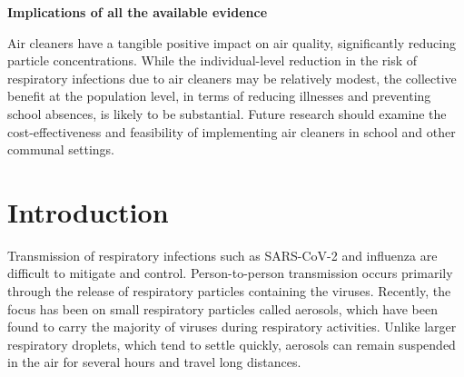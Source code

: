 \documentclass[fleqn,11pt]{wlscirep}
\begin{document}
\noindent \textbf{Implications of all the available evidence} \smallskip

\noindent Air cleaners have a tangible positive impact on air quality, significantly reducing particle concentrations. While the individual-level reduction in the risk of respiratory infections due to air cleaners may be relatively modest, the collective benefit at the population level, in terms of reducing illnesses and preventing school absences, is likely to be substantial. Future research should examine the cost-effectiveness and feasibility of implementing air cleaners in school and other communal settings.  
 

\thispagestyle{empty}
\sloppy
\raggedbottom

\newpage

\setcounter{page}{1}

\section*{Introduction} 

Transmission of respiratory infections such as SARS-CoV-2 and influenza are difficult to mitigate and control. Person-to-person transmission occurs primarily through the release of respiratory particles containing the viruses. Recently, the focus has been on small respiratory particles called aerosols, which have been found to carry the majority of viruses during respiratory activities.\cite{Fennelly2020} Unlike larger respiratory droplets, which tend to settle quickly, aerosols can remain suspended in the air for several hours and travel long distances.\cite{Wang2020}
\end{document}
